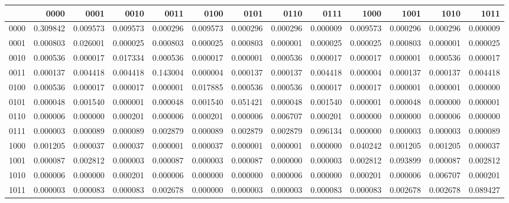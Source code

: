 \begin{tabular}{lrrrrrrrrrrrr}
\toprule
 & 0000 & 0001 & 0010 & 0011 & 0100 & 0101 & 0110 & 0111 & 1000 & 1001 & 1010 & 1011 \\
\midrule
0000 & 0.309842 & 0.009573 & 0.009573 & 0.000296 & 0.009573 & 0.000296 & 0.000296 & 0.000009 & 0.009573 & 0.000296 & 0.000296 & 0.000009 \\
0001 & 0.000803 & 0.026001 & 0.000025 & 0.000803 & 0.000025 & 0.000803 & 0.000001 & 0.000025 & 0.000025 & 0.000803 & 0.000001 & 0.000025 \\
0010 & 0.000536 & 0.000017 & 0.017334 & 0.000536 & 0.000017 & 0.000001 & 0.000536 & 0.000017 & 0.000017 & 0.000001 & 0.000536 & 0.000017 \\
0011 & 0.000137 & 0.004418 & 0.004418 & 0.143004 & 0.000004 & 0.000137 & 0.000137 & 0.004418 & 0.000004 & 0.000137 & 0.000137 & 0.004418 \\
0100 & 0.000536 & 0.000017 & 0.000017 & 0.000001 & 0.017885 & 0.000536 & 0.000536 & 0.000017 & 0.000017 & 0.000001 & 0.000001 & 0.000000 \\
0101 & 0.000048 & 0.001540 & 0.000001 & 0.000048 & 0.001540 & 0.051421 & 0.000048 & 0.001540 & 0.000001 & 0.000048 & 0.000000 & 0.000001 \\
0110 & 0.000006 & 0.000000 & 0.000201 & 0.000006 & 0.000201 & 0.000006 & 0.006707 & 0.000201 & 0.000000 & 0.000000 & 0.000006 & 0.000000 \\
0111 & 0.000003 & 0.000089 & 0.000089 & 0.002879 & 0.000089 & 0.002879 & 0.002879 & 0.096134 & 0.000000 & 0.000003 & 0.000003 & 0.000089 \\
1000 & 0.001205 & 0.000037 & 0.000037 & 0.000001 & 0.000037 & 0.000001 & 0.000001 & 0.000000 & 0.040242 & 0.001205 & 0.001205 & 0.000037 \\
1001 & 0.000087 & 0.002812 & 0.000003 & 0.000087 & 0.000003 & 0.000087 & 0.000000 & 0.000003 & 0.002812 & 0.093899 & 0.000087 & 0.002812 \\
1010 & 0.000006 & 0.000000 & 0.000201 & 0.000006 & 0.000000 & 0.000000 & 0.000006 & 0.000000 & 0.000201 & 0.000006 & 0.006707 & 0.000201 \\
1011 & 0.000003 & 0.000083 & 0.000083 & 0.002678 & 0.000000 & 0.000003 & 0.000003 & 0.000083 & 0.000083 & 0.002678 & 0.002678 & 0.089427 \\
\bottomrule
\end{tabular}
